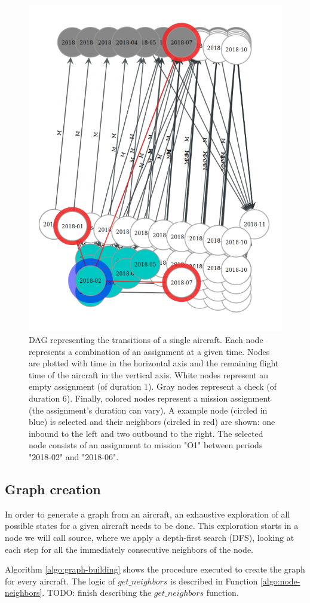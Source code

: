\documentclass[a4paper,11pt]{article}
\begin{document}
    \begin{figure}
        \centering
        \includegraphics[height=0.7 \linewidth]{example_graph_1.png}
        \caption{DAG representing the transitions of a single aircraft. Each node represents a combination of an assignment at a given time. Nodes are plotted with time in the horizontal axis and the remaining flight time of the aircraft in the vertical axis. White nodes represent an empty assignment (of duration 1). Gray nodes represent a check (of duration 6). Finally, colored nodes represent a mission assignment (the assignment's duration can vary). A example node (circled in blue) is selected and their neighbors (circled in red) are shown: one inbound to the left and two outbound to the right. The selected node consists of an assignment to mission "O1" between periods "2018-02" and "2018-06".} \label{fig:graph_resource1}
    \end{figure}

  \subsection{Graph creation}

    In order to generate a graph from an aircraft, an exhaustive exploration of all possible states for a given aircraft needs to be done. This exploration starts in a node we will call source, where we apply a depth-first search (DFS), looking at each step for all the immediately consecutive neighbors of the node.

    Algorithm \ref{algo:graph-building} shows the procedure executed to create the graph for every aircraft. The logic of $get\_neighbors$ is described in Function \ref{algo:node-neighbors}. TODO: finish describing the $get\_neighbors$ function.
\end{document}
